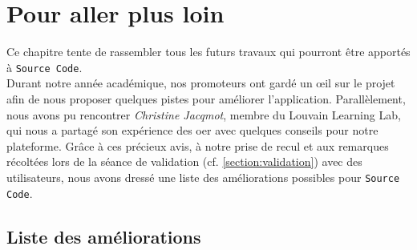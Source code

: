 \chapter{Pour aller plus loin}
\label{chapter:pourAllerPlusLoin}

Ce chapitre tente de rassembler tous les futurs travaux qui pourront être apportés à \texttt{Source Code}.\\

Durant notre année académique, nos promoteurs ont gardé un œil sur le projet afin de nous proposer quelques pistes pour améliorer l'application.
Parallèlement, nous avons pu rencontrer \textit{Christine Jacqmot}, membre du Louvain Learning Lab, qui nous a partagé son expérience des \gls{oer} avec quelques conseils pour notre plateforme. 
Grâce à ces précieux avis, à notre prise de recul et aux remarques récoltées lors de la séance de validation (cf. \ref{section:validation}) avec des utilisateurs, nous avons dressé une liste des améliorations possibles pour \texttt{Source Code}.

\section{Liste des améliorations}

